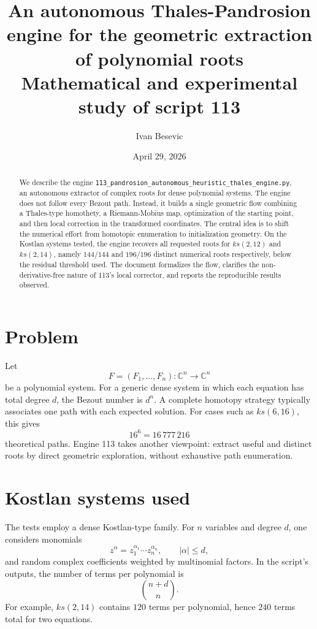 \documentclass[11pt,a4paper]{article}
\title{An autonomous Thales-Pandrosion engine for the geometric extraction of polynomial roots\\\large Mathematical and experimental study of script 113}
\author{Ivan Besevic}
\date{April 29, 2026}
\begin{document}
\maketitle

\begin{abstract}
We describe the engine \texttt{113\_pandrosion\_autonomous\_heuristic\_thales\_engine.py}, an autonomous extractor of complex roots for dense polynomial systems. The engine does not follow every Bezout path. Instead, it builds a single geometric flow combining a Thales-type homothety, a Riemann-Mobius map, optimization of the starting point, and then local correction in the transformed coordinates. The central idea is to shift the numerical effort from homotopic enumeration to initialization geometry. On the Kostlan systems tested, the engine recovers all requested roots for \(ks(2,12)\) and \(ks(2,14)\), namely \(144/144\) and \(196/196\) distinct numerical roots respectively, below the residual threshold used. The document formalizes the flow, clarifies the non-derivative-free nature of 113's local corrector, and reports the reproducible results observed.
\end{abstract}

\section{Problem}
Let
\[
  F=(F_1,\ldots,F_n):\mathbb C^n\to\mathbb C^n
\]
be a polynomial system. For a generic dense system in which each equation has total degree \(d\), the Bezout number is \(d^n\). A complete homotopy strategy typically associates one path with each expected solution. For cases such as \(ks(6,16)\), this gives
\[
  16^6 = 16\,777\,216
\]
theoretical paths. Engine 113 takes another viewpoint: extract useful and distinct roots by direct geometric exploration, without exhaustive path enumeration.

\section{Kostlan systems used}
The tests employ a dense Kostlan-type family. For \(n\) variables and degree \(d\), one considers monomials
\[
  z^\alpha = z_1^{\alpha_1}\cdots z_n^{\alpha_n},\qquad |\alpha|\le d,
\]
and random complex coefficients weighted by multinomial factors. In the script's outputs, the number of terms per polynomial is
\[
  \binom{n+d}{n}.
\]
For example, \(ks(2,14)\) contains \(120\) terms per polynomial, hence \(240\) terms total for two equations.
\end{document}
